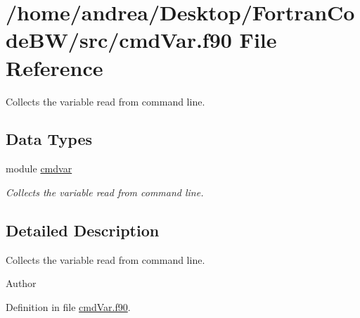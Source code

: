 \hypertarget{cmd_var_8f90}{\section{/home/andrea/\-Desktop/\-Fortran\-Code\-B\-W/src/cmd\-Var.f90 File Reference}
\label{cmd_var_8f90}
}


Collects the variable read from command line.  


\subsection*{Data Types}
\begin{DoxyCompactItemize}
\item 
module \hyperlink{classcmdvar}{cmdvar}
\begin{DoxyCompactList}\small\item\em Collects the variable read from command line. \end{DoxyCompactList}\end{DoxyCompactItemize}


\subsection{Detailed Description}
Collects the variable read from command line. \begin{DoxyAuthor}{Author}

\end{DoxyAuthor}


Definition in file \hyperlink{cmd_var_8f90_source}{cmd\-Var.\-f90}.

